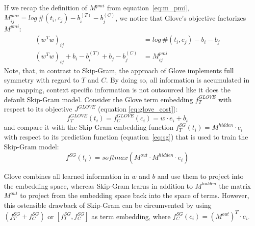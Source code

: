 If we recap the definition of $M^{pmi}$ from equation~\eqref{eq:m_pmi}, $M^{pmi}_{ij}= log\,\#(t_i, c_j) - b^{(T)}_i - b^{(C)}_j$, we notice that Glove's objective factorizes $M^{pmi}$:%
\begin{align}
(w^Tw)_{ij} & = log\,\#(t_i, c_j) - b_i - b_j \\
(w^Tw)_{ij} + b_i - b^{(T)}_i + b_j - b^{(C)}_j & = M^{pmi}_{ij}
\end{align}
Note, that, in contrast to Skip-Gram, the approach of Glove implements full symmetry with regard to $T$ and $C$. By doing so, all information is accumulated in one mapping, context specific information is not outsourced like it does the default Skip-Gram model. Consider the Glove term embedding $f_T^{GLOVE}$ with respect to its objective $J^{GLOVE}$ (equation \ref{eq:glove_cost}):%
\begin{equation}
f_T^{GLOVE}(t_i) = f_C^{GLOVE}(c_i) = w \cdot e_i + b_i 
\end{equation}
and compare it with the Skip-Gram embedding function $f_T^{SG}(t_i) = M^{hidden} \cdot e_i$ with respect to its prediction function (equation~\ref{eq:sg}) that is used to train the Skip-Gram model:
\begin{equation}
f^{SG}(t_i) = softmax(M^{out} \cdot M^{hidden} \cdot e_i)
\end{equation}

Glove combines all learned information in $w$ and $b$ and use them to project into the embedding space, whereas Skip-Gram learns in addition to $M^{hidden}$ the matrix $M^{out}$ to project from the embedding space back into the space of terms.
However, this ostensible drawback of Skip-Gram can be circumvented by using $(f^{SG}_T + f^{SG}_C)$ or $[f^{SG}_T, f^{SG}_C]$ as term embedding, where $f_C^{SG}(c_i) = (M^{out})^T \cdot e_i$.

